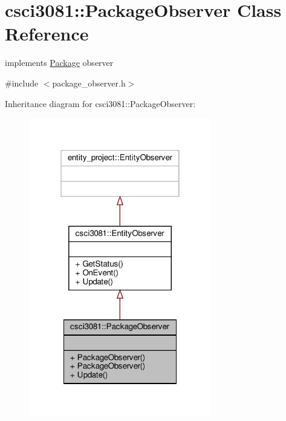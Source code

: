 \hypertarget{classcsci3081_1_1PackageObserver}{}\section{csci3081\+:\+:Package\+Observer Class Reference}
\label{classcsci3081_1_1PackageObserver}


implements \hyperlink{classcsci3081_1_1Package}{Package} observer  




{\ttfamily \#include $<$package\+\_\+observer.\+h$>$}



Inheritance diagram for csci3081\+:\+:Package\+Observer\+:\nopagebreak
\begin{figure}[H]
\begin{center}
\leavevmode
\includegraphics[width=226pt]{classcsci3081_1_1PackageObserver__inherit__graph}
\end{center}
\end{figure}


